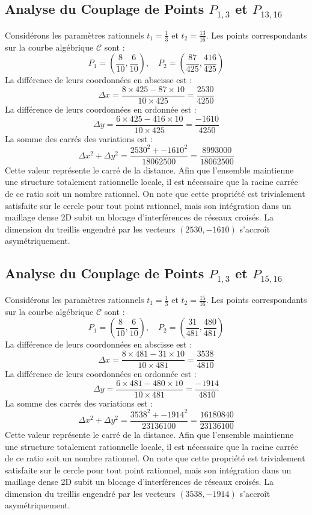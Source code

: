 \documentclass[12pt, a4paper]{article}
\begin{document}
\subsection{Analyse du Couplage de Points $P_{1,3}$ et $P_{13,16}$}
Considérons les paramètres rationnels $t_1 = \frac{1}{3}$ et $t_2 = \frac{13}{16}$.
Les points correspondants sur la courbe algébrique $\mathcal{C}$ sont :
$$ P_1 = \left( \frac{8}{10}, \frac{6}{10} \right), \quad P_2 = \left( \frac{87}{425}, \frac{416}{425} \right) $$
La différence de leurs coordonnées en abscisse est :
$$ \Delta x = \frac{8 \times 425 - 87 \times 10}{10 \times 425} = \frac{2530}{4250} $$
La différence de leurs coordonnées en ordonnée est :
$$ \Delta y = \frac{6 \times 425 - 416 \times 10}{10 \times 425} = \frac{-1610}{4250} $$
La somme des carrés des variations est :
$$ \Delta x^2 + \Delta y^2 = \frac{ 2530^2 + -1610^2 }{ 18062500 } = \frac{ 8993000 }{ 18062500 } $$
Cette valeur représente le carré de la distance. Afin que l'ensemble maintienne une structure totalement rationnelle locale, il est nécessaire que la racine carrée de ce ratio soit un nombre rationnel. On note que cette propriété est trivialement satisfaite sur le cercle pour tout point rationnel, mais son intégration dans un maillage dense 2D subit un blocage d'interférences de réseaux croisés. La dimension du treillis engendré par les vecteurs $( 2530, -1610 )$ s'accroît asymétriquement.


\subsection{Analyse du Couplage de Points $P_{1,3}$ et $P_{15,16}$}
Considérons les paramètres rationnels $t_1 = \frac{1}{3}$ et $t_2 = \frac{15}{16}$.
Les points correspondants sur la courbe algébrique $\mathcal{C}$ sont :
$$ P_1 = \left( \frac{8}{10}, \frac{6}{10} \right), \quad P_2 = \left( \frac{31}{481}, \frac{480}{481} \right) $$
La différence de leurs coordonnées en abscisse est :
$$ \Delta x = \frac{8 \times 481 - 31 \times 10}{10 \times 481} = \frac{3538}{4810} $$
La différence de leurs coordonnées en ordonnée est :
$$ \Delta y = \frac{6 \times 481 - 480 \times 10}{10 \times 481} = \frac{-1914}{4810} $$
La somme des carrés des variations est :
$$ \Delta x^2 + \Delta y^2 = \frac{ 3538^2 + -1914^2 }{ 23136100 } = \frac{ 16180840 }{ 23136100 } $$
Cette valeur représente le carré de la distance. Afin que l'ensemble maintienne une structure totalement rationnelle locale, il est nécessaire que la racine carrée de ce ratio soit un nombre rationnel. On note que cette propriété est trivialement satisfaite sur le cercle pour tout point rationnel, mais son intégration dans un maillage dense 2D subit un blocage d'interférences de réseaux croisés. La dimension du treillis engendré par les vecteurs $( 3538, -1914 )$ s'accroît asymétriquement.
\end{document}
